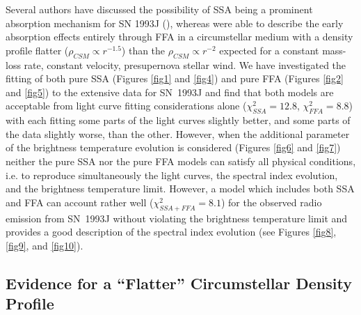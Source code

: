 \documentclass[12pt,preprint]{aastex}
\begin{document}
Several authors have discussed the possibility of SSA being a prominent
absorption mechanism for SN 1993J (\citealt{Fransson98,Perez-Torres01,Bartel02}),
whereas \citet{VanDyk94} were able to describe the early absorption
effects entirely through FFA in a circumstellar medium with a density
profile flatter ($\rho_{CSM} \propto r^{-1.5}$) than the $\rho_{CSM} \propto r^{-2}$ expected for a
constant mass-loss rate, constant velocity, presupernova stellar wind. We have investigated the fitting of both pure SSA (Figures \ref{fig1} and \ref{fig4}) and pure FFA (Figures \ref{fig2} and \ref{fig5}) to the extensive data for SN~1993J and find that both models are acceptable from light curve fitting considerations alone ($\chi_{SSA}^2 = 12.8$, $\chi_{FFA}^2 = 8.8$) with each fitting some parts of the light curves slightly better, and some parts of the data slightly worse, than the other. However, when the additional parameter of the brightness temperature evolution is considered (Figures \ref{fig6} and \ref{fig7}) neither the pure SSA nor the pure FFA models can satisfy all physical  conditions, i.e. to reproduce simultaneously the light curves, the spectral index evolution, and the brightness temperature limit. However, a model which includes both SSA and FFA can account rather well ($\chi_{SSA+FFA}^2 = 8.1$) for the observed radio emission from SN~1993J without violating the brightness temperature limit and provides a good description of the spectral index evolution (see Figures \ref{fig8}, \ref{fig9}, and \ref{fig10}).

\subsection{Evidence for a ``Flatter'' Circumstellar Density Profile}
\end{document}
